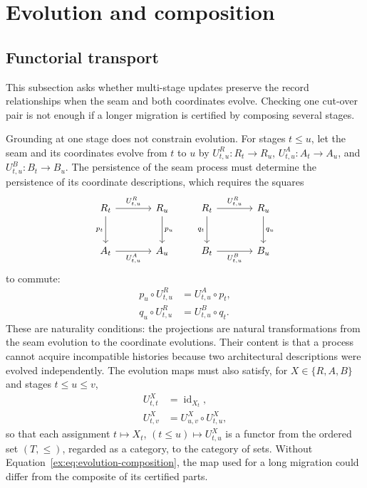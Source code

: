 \documentclass[twocolumn,envcountsect,envcountsame,natbib]{svjour3}
\begin{document}
\section{Evolution and composition}\label{ex:sec:evolution}

\subsection{Functorial transport}\label{ex:sec:functorial-transport}

This subsection asks whether multi-stage updates preserve the record relationships when the seam and both coordinates evolve. Checking one cut-over pair is not enough if a longer migration is certified by composing several stages.

Grounding at one stage does not constrain evolution. For stages $t\leq u$, let the seam and its coordinates evolve from $t$ to $u$ by
$U^{R}_{t,u}:R_t\to R_u$, $U^{A}_{t,u}:A_t\to A_u$, and $U^{B}_{t,u}:B_t\to B_u$. The persistence of the seam process must determine the persistence of its coordinate descriptions, which requires the squares
\begin{equation}\label{ex:eq:dynamic-squares}
\begin{tikzcd}[column sep=large,row sep=large,baseline=(current bounding box.center)]
R_t \arrow[r,"U^{R}_{t,u}"] \arrow[d,"p_t"']
  & R_u \arrow[d,"p_u"] \\
A_t \arrow[r,"U^{A}_{t,u}"'] & A_u
\end{tikzcd}
\qquad
\begin{tikzcd}[column sep=large,row sep=large,baseline=(current bounding box.center)]
R_t \arrow[r,"U^{R}_{t,u}"] \arrow[d,"q_t"']
  & R_u \arrow[d,"q_u"] \\
B_t \arrow[r,"U^{B}_{t,u}"'] & B_u
\end{tikzcd}
\end{equation}
to commute:
\begin{align}
p_{u}\circ U^R_{t,u} &=U^A_{t,u}\circ p_{t},\label{ex:eq:back-naturality}\\
q_{u}\circ U^R_{t,u} &=U^B_{t,u}\circ q_{t}. \label{ex:eq:fwd-naturality}
\end{align}
These are naturality conditions: the projections are natural transformations from the seam evolution to the coordinate evolutions. Their content is that a process cannot acquire incompatible histories because two architectural descriptions were evolved independently. The evolution maps must also satisfy, for $X \in \{R,A,B\}$ and stages $t\leq u\leq v$,
\begin{align}
U^{X}_{t,t} &=\operatorname{id}_{X_t},\label{ex:eq:evolution-identity}\\
U^{X}_{t,v} &=U^{X}_{u,v}\circ U^{X}_{t,u},\label{ex:eq:evolution-composition}
\end{align}
so that each assignment $t \mapsto X_t$, $(t\leq u)\mapsto U^X_{t,u}$ is a functor from the ordered set $(T,\leq)$, regarded as a category, to the category of sets. Without Equation~\eqref{ex:eq:evolution-composition}, the map used for a long migration could differ from the composite of its certified parts.
\end{document}
